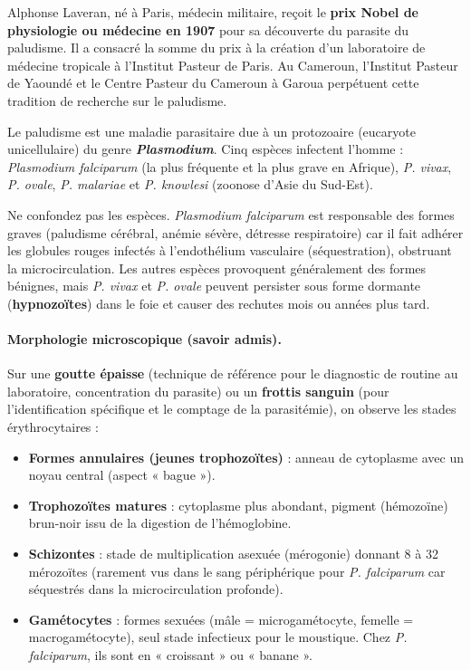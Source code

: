\documentclass[11pt]{article}
\begin{document}
\begin{savaistu}
Alphonse Laveran, né à Paris, médecin militaire, reçoit le \textbf{prix Nobel de physiologie ou médecine en 1907} pour sa découverte du parasite du paludisme. Il a consacré la somme du prix à la création d'un laboratoire de médecine tropicale à l'Institut Pasteur de Paris. Au Cameroun, l'Institut Pasteur de Yaoundé et le Centre Pasteur du Cameroun à Garoua perpétuent cette tradition de recherche sur le paludisme.
\end{savaistu}

\begin{definition}
Le paludisme est une maladie parasitaire due à un protozoaire (eucaryote unicellulaire) du genre \textbf{\emph{Plasmodium}}. Cinq espèces infectent l'homme : \emph{Plasmodium falciparum} (la plus fréquente et la plus grave en Afrique), \emph{P. vivax}, \emph{P. ovale}, \emph{P. malariae} et \emph{P. knowlesi} (zoonose d'Asie du Sud-Est).
\end{definition}

\begin{attention}
Ne confondez pas les espèces. \emph{Plasmodium falciparum} est responsable des formes graves (paludisme cérébral, anémie sévère, détresse respiratoire) car il fait adhérer les globules rouges infectés à l'endothélium vasculaire (séquestration), obstruant la microcirculation. Les autres espèces provoquent généralement des formes bénignes, mais \emph{P. vivax} et \emph{P. ovale} peuvent persister sous forme dormante (\textbf{hypnozoïtes}) dans le foie et causer des rechutes mois ou années plus tard.
\end{attention}

\paragraph{Morphologie microscopique (savoir admis).}
Sur une \textbf{goutte épaisse} (technique de référence pour le diagnostic de routine au laboratoire, concentration du parasite) ou un \textbf{frottis sanguin} (pour l'identification spécifique et le comptage de la parasitémie), on observe les stades érythrocytaires :
\begin{itemize}
    \item \textbf{Formes annulaires (jeunes trophozoïtes)} : anneau de cytoplasme avec un noyau central (aspect « bague »).
    \item \textbf{Trophozoïtes matures} : cytoplasme plus abondant, pigment (hémozoïne) brun-noir issu de la digestion de l'hémoglobine.
    \item \textbf{Schizontes} : stade de multiplication asexuée (mérogonie) donnant 8 à 32 mérozoïtes (rarement vus dans le sang périphérique pour \emph{P. falciparum} car séquestrés dans la microcirculation profonde).
    \item \textbf{Gamétocytes} : formes sexuées (mâle = microgamétocyte, femelle = macrogamétocyte), seul stade infectieux pour le moustique. Chez \emph{P. falciparum}, ils sont en « croissant » ou « banane ».
\end{itemize}
\end{document}
